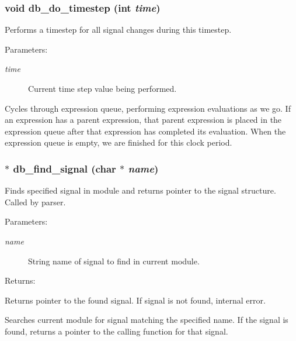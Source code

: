 \subsubsection{\setlength{\rightskip}{0pt plus 5cm}void db\_\-do\_\-timestep (int {\em time})}\label{db_8h_a18}


Performs a timestep for all signal changes during this timestep.

\begin{Desc}
\item[Parameters: ]\par
\begin{description}
\item[{\em 
time}]Current time step value being performed.\end{description}
\end{Desc}
Cycles through expression queue, performing expression evaluations as we go. If an expression has a parent expression, that parent expression is placed in the expression queue after that expression has completed its evaluation. When the expression queue is empty, we are finished for this clock period. 
\subsubsection{$\ast$ db\_\-find\_\-signal (char $\ast$ {\em name})}\label{db_8h_a5}


Finds specified signal in module and returns pointer to the signal structure. Called by parser.

\begin{Desc}
\item[Parameters: ]\par
\begin{description}
\item[{\em 
name}]String name of signal to find in current module.\end{description}
\end{Desc}
\begin{Desc}
\item[Returns: ]\par
Returns pointer to the found signal. If signal is not found, internal error.\end{Desc}
Searches current module for signal matching the specified name. If the signal is found, returns a pointer to the calling function for that signal. 
